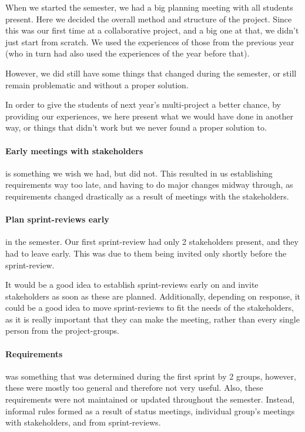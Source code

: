 When we started the semester, we had a big planning meeting with all students present.
Here we decided the overall method and structure of the project.
Since this was our first time at a collaborative project, and a big one at that, we didn't just start from scratch.
We used the experiences of those from the previous year (who in turn had also used the experiences of the year before that).

However, we did still have some things that changed during the semester, or still remain problematic and without a proper solution.

In order to give the students of next year's multi-project a better chance, by providing our experiences, we here present what we would have done in another way, or things that didn't work but we never found a proper solution to.

\paragraph{Early meetings with stakeholders} is something we wish we had, but did not.
This resulted in us establishing requirements way too late, and having to do major changes midway through, as requirements changed drastically as a result of meetings with the stakeholders.

\paragraph{Plan sprint-reviews early} in the semester.
Our first sprint-review had only 2 stakeholders present, and they had to leave early.
This was due to them being invited only shortly before the sprint-review.

It would be a good idea to establish sprint-reviews early on and invite stakeholders as soon as these are planned.
Additionally, depending on response, it could be a good idea to move sprint-reviews to fit the needs of the stakeholders, as it is really important that they can make the meeting, rather than every single person from the project-groups.

\paragraph{Requirements} was something that was determined during the first sprint by 2 groups, however, these were mostly too general and therefore not very useful.
Also, these requirements were not maintained or updated throughout the semester.
Instead, informal rules formed as a result of status meetings, individual group's meetings with stakeholders, and from sprint-reviews.

